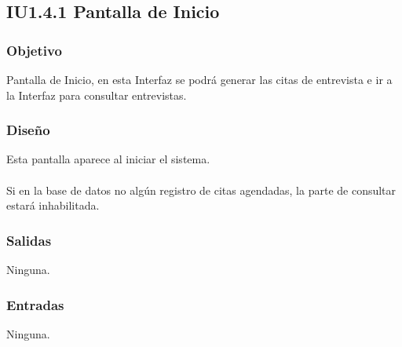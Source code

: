 \newpage
\subsection{IU1.4.1 Pantalla de Inicio}

\subsubsection{Objetivo}
	Pantalla de Inicio, en esta Interfaz se podrá generar las citas de entrevista e ir a la Interfaz para consultar entrevistas.  

\subsubsection{Diseño}
	Esta pantalla aparece al iniciar el sistema.  \\\\
	Si en la base de datos no algún registro de citas agendadas, la parte de consultar estará inhabilitada. 


\subsubsection{Salidas}
	\begin{Citemize}
		\item Ninguna. 
	\end{Citemize}
	
\subsubsection{Entradas}
	\begin{Citemize}
		\item Ninguna. 
	\end{Citemize}

